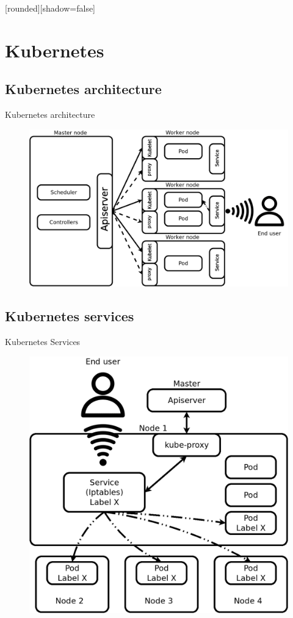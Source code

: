 [rounded][shadow=false]

\section{Kubernetes}

\subsection{Kubernetes architecture}
\addtocounter{framenumber}{-1}
\begin{withoutheadline}
\begin{frame}{Kubernetes architecture}

\begin{figure}[p]

\includegraphics[width=0.95\linewidth]{figures/arch.png}
  
\end{figure}

\end{frame}
\end{withoutheadline}

\subsection{Kubernetes services}
\addtocounter{framenumber}{-1}
\begin{withoutheadline}
\begin{frame}{Kubernetes Services}

\begin{figure}[p]

\includegraphics[width=0.7\linewidth]{figures/svc.png}
  
\end{figure}

\end{frame}
\end{withoutheadline}
